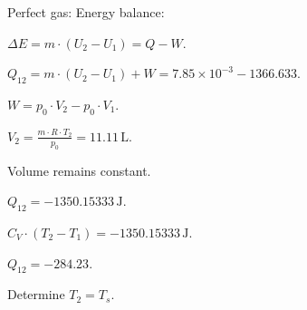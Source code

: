Perfect gas:  
Energy balance:  

\( \Delta E = m \cdot (U_2 - U_1) = Q - W \).  

\( Q_{12} = m \cdot (U_2 - U_1) + W = 7.85 \times 10^{-3} - 1366.633 \).  

\( W = p_0 \cdot V_2 - p_0 \cdot V_1 \).  

\( V_2 = \frac{m \cdot R \cdot T_2}{p_0} = 11.11 \, \text{L} \).  

Volume remains constant.  

\( Q_{12} = -1350.15333 \, \text{J} \).  

\( C_V \cdot (T_2 - T_1) = -1350.15333 \, \text{J} \).  

\( Q_{12} = -284.23 \).

Determine \( T_2 = T_s \).